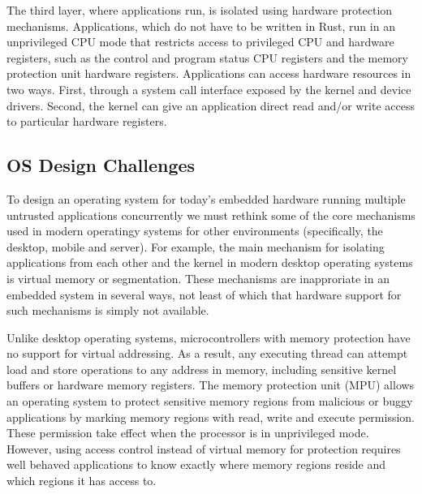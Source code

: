The third layer, where applications run, is isolated using hardware protection
mechanisms. Applications, which do not have to be written in Rust, run in an
unprivileged CPU mode that restricts access to privileged CPU and hardware
registers, such as the control and program status CPU registers and the memory
protection unit hardware registers. Applications can access hardware resources
in two ways. First, through a system call interface exposed by the kernel and
device drivers.  Second, the kernel can give an application direct read and/or
write access to particular hardware registers.


% 

\subsection{OS Design Challenges}

To design an operating system for today's embedded hardware running multiple
untrusted applications concurrently we must rethink some of the core mechanisms
used in modern operatingy systems for other environments (specifically, the
desktop, mobile and server). For example, the main mechanism for isolating
applications from each other and the kernel in modern desktop operating systems
is virtual memory or segmentation. These mechanisms are inapproriate in an
embedded system in several ways, not least of which that hardware support for
such mechanisms is simply not available.

Unlike desktop operating systems, microcontrollers with memory protection have
no support for virtual addressing. As a result, any executing thread can attempt
load and store operations to any address in memory, including sensitive kernel
buffers or hardware memory registers. The memory protection unit (MPU) allows an
operating system to protect sensitive memory regions from malicious or buggy
applications by marking memory regions with read, write and execute permission.
These permission take effect when the processor is in unprivileged mode.
However, using access control instead of virtual memory for protection requires
well behaved applications to know exactly where memory regions reside and which
regions it has access to.

